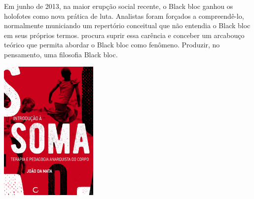 \medskip

\noindent{}Em junho de 2013, na maior erupção social recente, o Black bloc ganhou os holofotes como nova prática de luta. Analistas foram forçados a compreendê-lo, normalmente municiando um repertório conceitual que não entendia o Black bloc em seus próprios termos. {} procura suprir essa carência e conceber um arcabouço teórico que permita abordar o Black bloc como fenômeno. Produzir, no pensamento, uma filosofia Black bloc.

\vfill

\hspace*{-.4cm}\begin{minipage}[c]{1\linewidth}
\small{
{}}
\end{minipage}

\pagebreak

\hspace{.5cm}

\begin{center}
\hspace*{-.5cm}\includegraphics[width=48mm]{./imgs/soma.jpg}
\end{center}

\hspace*{-7cm}\hrulefill\hspace*{-7cm}

